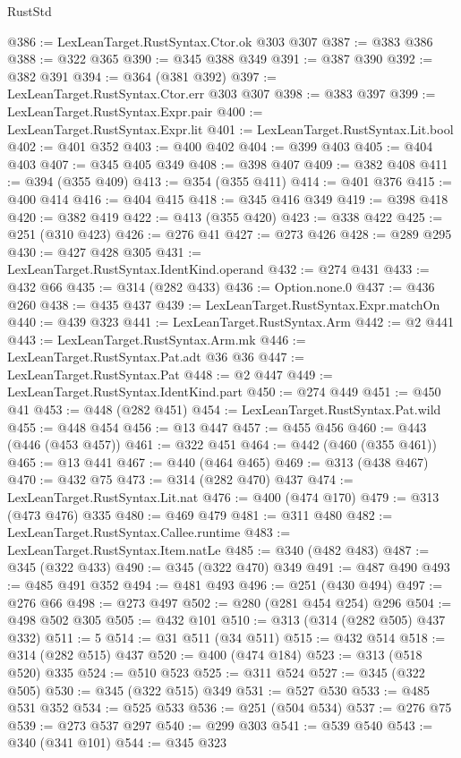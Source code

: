 \begin{lexlean}{RustStd}
\begin{coremodule}
@386 := LexLeanTarget.RustSyntax.Ctor.ok @303 @307
@387 := @383 @386
@388 := @322 @365
@390 := @345 @388 @349
@391 := @387 @390
@392 := @382 @391
@394 := @364 (@381 @392)
@397 := LexLeanTarget.RustSyntax.Ctor.err @303 @307
@398 := @383 @397
@399 := LexLeanTarget.RustSyntax.Expr.pair
@400 := LexLeanTarget.RustSyntax.Expr.lit
@401 := LexLeanTarget.RustSyntax.Lit.bool
@402 := @401 @352
@403 := @400 @402
@404 := @399 @403
@405 := @404 @403
@407 := @345 @405 @349
@408 := @398 @407
@409 := @382 @408
@411 := @394 (@355 @409)
@413 := @354 (@355 @411)
@414 := @401 @376
@415 := @400 @414
@416 := @404 @415
@418 := @345 @416 @349
@419 := @398 @418
@420 := @382 @419
@422 := @413 (@355 @420)
@423 := @338 @422
@425 := @251 (@310 @423)
@426 := @276 @41
@427 := @273 @426
@428 := @289 @295
@430 := @427 @428 @305
@431 := LexLeanTarget.RustSyntax.IdentKind.operand
@432 := @274 @431
@433 := @432 @66
@435 := @314 (@282 @433)
@436 := Option.none.{0}
@437 := @436 @260
@438 := @435 @437
@439 := LexLeanTarget.RustSyntax.Expr.matchOn
@440 := @439 @323
@441 := LexLeanTarget.RustSyntax.Arm
@442 := @2 @441
@443 := LexLeanTarget.RustSyntax.Arm.mk
@446 := LexLeanTarget.RustSyntax.Pat.adt @36 @36
@447 := LexLeanTarget.RustSyntax.Pat
@448 := @2 @447
@449 := LexLeanTarget.RustSyntax.IdentKind.part
@450 := @274 @449
@451 := @450 @41
@453 := @448 (@282 @451)
@454 := LexLeanTarget.RustSyntax.Pat.wild
@455 := @448 @454
@456 := @13 @447
@457 := @455 @456
@460 := @443 (@446 (@453 @457))
@461 := @322 @451
@464 := @442 (@460 (@355 @461))
@465 := @13 @441
@467 := @440 (@464 @465)
@469 := @313 (@438 @467)
@470 := @432 @75
@473 := @314 (@282 @470) @437
@474 := LexLeanTarget.RustSyntax.Lit.nat
@476 := @400 (@474 @170)
@479 := @313 (@473 @476) @335
@480 := @469 @479
@481 := @311 @480
@482 := LexLeanTarget.RustSyntax.Callee.runtime
@483 := LexLeanTarget.RustSyntax.Item.natLe
@485 := @340 (@482 @483)
@487 := @345 (@322 @433)
@490 := @345 (@322 @470) @349
@491 := @487 @490
@493 := @485 @491 @352
@494 := @481 @493
@496 := @251 (@430 @494)
@497 := @276 @66
@498 := @273 @497
@502 := @280 (@281 @454 @254) @296
@504 := @498 @502 @305
@505 := @432 @101
@510 := @313 (@314 (@282 @505) @437 @332)
@511 := 5
@514 := @31 @511 (@34 @511)
@515 := @432 @514
@518 := @314 (@282 @515) @437
@520 := @400 (@474 @184)
@523 := @313 (@518 @520) @335
@524 := @510 @523
@525 := @311 @524
@527 := @345 (@322 @505)
@530 := @345 (@322 @515) @349
@531 := @527 @530
@533 := @485 @531 @352
@534 := @525 @533
@536 := @251 (@504 @534)
@537 := @276 @75
@539 := @273 @537 @297
@540 := @299 @303
@541 := @539 @540
@543 := @340 (@341 @101)
@544 := @345 @323

\end{coremodule}
\end{lexlean}
